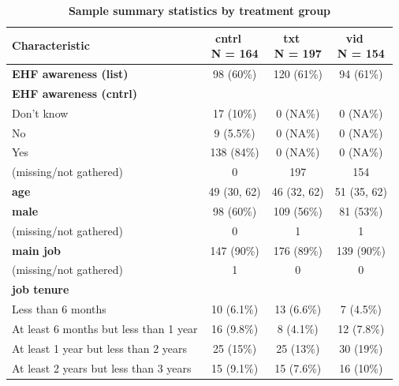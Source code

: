\documentclass[
  11pt,
  oneside]{article}
\begin{document}
\begin{table}

\caption{\label{tab:tab-sum-uw}\textbf{Sample summary statistics by treatment group}}
\centering
\begin{tabular}[t]{l|c|c|c}
\hline
\textbf{Characteristic} & \makecell[c]{\textbf{cntrl}\ \ \\N = 164} & \makecell[c]{\textbf{txt}\ \ \\N = 197} & \makecell[c]{\textbf{vid}\ \ \\N = 154}\\
\hline
\textbf{EHF awareness (list)} & 98 (60\%) & 120 (61\%) & 94 (61\%)\\
\hline
\textbf{EHF awareness (cntrl)} &  &  & \\
\hline
\hspace{1em}Don’t know & 17 (10\%) & 0 (NA\%) & 0 (NA\%)\\
\hline
\hspace{1em}No & 9 (5.5\%) & 0 (NA\%) & 0 (NA\%)\\
\hline
\hspace{1em}Yes & 138 (84\%) & 0 (NA\%) & 0 (NA\%)\\
\hline
\hspace{1em}(missing/not gathered) & 0 & 197 & 154\\
\hline
\textbf{age} & 49 (30, 62) & 46 (32, 62) & 51 (35, 62)\\
\hline
\textbf{male} & 98 (60\%) & 109 (56\%) & 81 (53\%)\\
\hline
\hspace{1em}(missing/not gathered) & 0 & 1 & 1\\
\hline
\textbf{main job} & 147 (90\%) & 176 (89\%) & 139 (90\%)\\
\hline
\hspace{1em}(missing/not gathered) & 1 & 0 & \vphantom{1} 0\\
\hline
\textbf{job tenure} &  &  & \\
\hline
\hspace{1em}Less than 6 months & 10 (6.1\%) & 13 (6.6\%) & 7 (4.5\%)\\
\hline
\hspace{1em}At least 6 months but less than 1 year & 16 (9.8\%) & 8 (4.1\%) & 12 (7.8\%)\\
\hline
\hspace{1em}At least 1 year but less than 2 years & 25 (15\%) & 25 (13\%) & 30 (19\%)\\
\hline
\hspace{1em}At least 2 years but less than 3 years & 15 (9.1\%) & 15 (7.6\%) & 16 (10\%)\\

\end{tabular}
\end{table}
\end{document}
